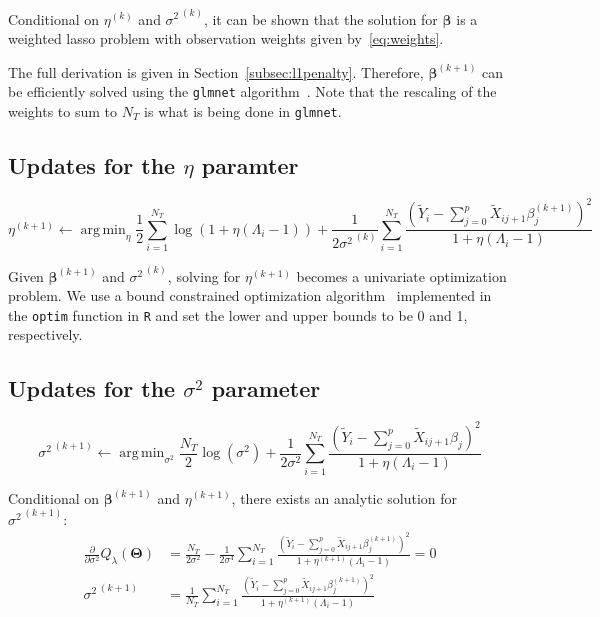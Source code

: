 \documentclass[12pt,letter]{article}\usepackage[]{graphicx}\usepackage[]{color}
\makeatletter
\newcommand{\Xtilde}{\widetilde{X}}
\newcommand{\Ytilde}{\widetilde{Y}}
\newcommand{\bTheta}{\boldsymbol{\Theta}}
\newcommand{\bmu}{\boldsymbol{\mu}}
\newcommand{\bbeta}{\boldsymbol{\beta}}
\DeclareMathOperator*{\argmin}{arg\,min}
\DeclarePairedDelimiter\norm{\lVert}{\rVert}%
\let\oldnorm\norm
\def\norm{\@ifstar{\oldnorm}{\oldnorm*}}
\makeatother
\begin{document}
\newpage
Conditional on $\eta^{(k)}$ and ${\sigma^2}^{\,(k)}$, it can be shown that the solution for $\bbeta$ is a weighted lasso problem with observation weights given by~\eqref{eq:weights}.

The full derivation is given in Section~\ref{subsec:l1penalty}. Therefore, $\bbeta^{(k+1)}$ can be efficiently solved using the \texttt{glmnet} algorithm~\citep{friedman2010regularization}. Note that the rescaling of the weights to sum to $N_T$ is what is being done in \texttt{glmnet}.



\subsection{Updates for the $\eta$ paramter}
\begin{equation}
	\eta^{(k+1)} \leftarrow \argmin_{\eta}  \frac{1}{2} \sum_{i=1}^{N_T} \log(1 + \eta (\Lambda_i-1)) + \frac{1}{2{\sigma^2}^{\,(k)}} \sum_{i=1}^{N_T}\frac{\left(  \Ytilde_i - \sum_{j=0}^{p}\Xtilde_{ij+1}\beta_j^{(k+1)} \right) ^2}{1 + \eta (\Lambda_i-1)}
\end{equation}


Given $\bbeta^{(k+1)}$ and ${\sigma^2}^{\,(k)}$, solving for $\eta^{(k+1)}$ becomes a univariate optimization problem. We use a bound constrained optimization algorithm~\citep{byrd1995limited} implemented in the \texttt{optim} function in \texttt{R} and set the lower and upper bounds to be 0 and 1, respectively.




\subsection{Updates for the $\sigma^2$ parameter}
\begin{equation}
	{\sigma^2}^{\,(k+1)} \leftarrow \argmin_{\sigma^2}  \frac{N_T}{2}\log(\sigma^2) + \frac{1}{2\sigma^2} \sum_{i=1}^{N_T}\frac{\left(  \Ytilde_i - \sum_{j=0}^{p}\Xtilde_{ij+1}\beta_j \right) ^2}{1 + \eta (\Lambda_i-1)}
\end{equation}

Conditional on $\bbeta^{(k+1)}$ and $\eta^{(k+1)}$, there exists an analytic solution for ${\sigma^2}^{\,(k+1)}$:
\begin{align}
	\frac{\partial}{\partial \sigma^2} Q_{\lambda}(\bTheta) &= \frac{N_T}{2\sigma^2}- \frac{1}{2\sigma^4} \sum_{i=1}^{N_T}\frac{\left(  \Ytilde_i - \sum_{j=0}^{p}\Xtilde_{ij+1}\beta_j^{(k+1)} \right) ^2}{1 + \eta^{(k+1)} (\Lambda_i-1)} = 0 \nonumber \\
	{\sigma^2}^{\,(k+1)} & = \frac{1}{N_T}\sum_{i=1}^{N_T}\frac{\left(  \Ytilde_i - \sum_{j=0}^{p}\Xtilde_{ij+1}\beta_j^{(k+1)} \right) ^2}{1 + \eta^{(k+1)} (\Lambda_i-1)} \label{eq:sigmahat2}
\end{align}
\end{document}
